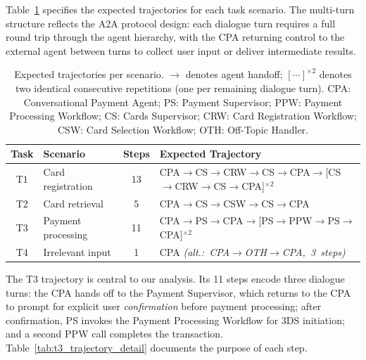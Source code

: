 Table~\ref{tab:expected_trajectories} specifies the expected trajectories for each task scenario. The multi-turn structure reflects the A2A protocol design: each dialogue turn requires a full round trip through the agent hierarchy, with the CPA returning control to the external agent between turns to collect user input or deliver intermediate results.

\begin{table}[htbp]
    \centering
    \caption{Expected trajectories per scenario. $\to$ denotes agent handoff; $[\cdots]^{\times 2}$ denotes two identical consecutive repetitions (one per remaining dialogue turn). CPA: Conversational Payment Agent; PS: Payment Supervisor; PPW: Payment Processing Workflow; CS: Cards Supervisor; CRW: Card Registration Workflow; CSW: Card Selection Workflow; OTH: Off-Topic Handler.}
    \label{tab:expected_trajectories}
    \renewcommand{\arraystretch}{1.1}
    \footnotesize
    \begin{tabular}{c l c l}
        \toprule
        \textbf{Task} & \textbf{Scenario} & \textbf{Steps} & \textbf{Expected Trajectory} \\
        \midrule
        T1    & Card registration  & 13 & CPA$\to$CS$\to$CRW$\to$CS$\to$CPA$\to$[CS$\to$CRW$\to$CS$\to$CPA]$^{\times 2}$ \\
        T2    & Card retrieval     &  5 & CPA$\to$CS$\to$CSW$\to$CS$\to$CPA \\
        T3    & Payment processing & 11 & CPA$\to$PS$\to$CPA$\to$[PS$\to$PPW$\to$PS$\to$CPA]$^{\times 2}$ \\
        T4    & Irrelevant input   &  1 & CPA \quad \textit{(alt.:~CPA$\to$OTH$\to$CPA,~3~steps)} \\
        \bottomrule
    \end{tabular}
\end{table}

The T3 trajectory is central to our analysis. Its 11 steps encode three dialogue turns: the CPA hands off to the Payment Supervisor, which returns to the CPA to prompt for explicit user \textit{confirmation} before payment processing; after confirmation, PS invokes the Payment Processing Workflow for 3DS initiation; and a second PPW call completes the transaction. Table~\ref{tab:t3_trajectory_detail} documents the purpose of each step.

